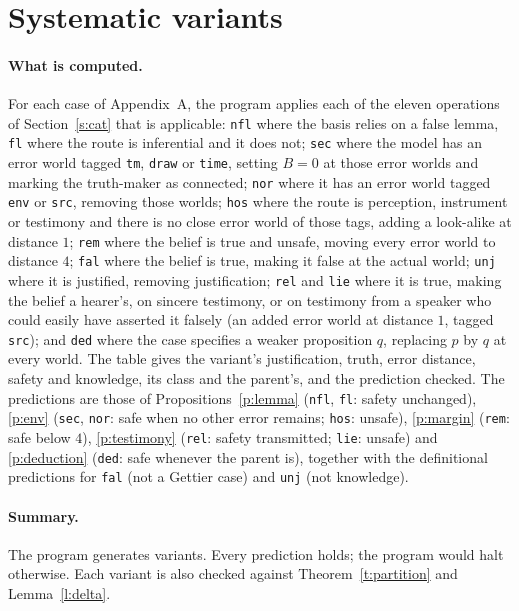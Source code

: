 \documentclass{situationist-preprint}
\begin{document}


\section{Systematic variants}\label{app:b}

\paragraph{What is computed.} For each case of Appendix~A, the program applies each of the eleven operations of Section~\ref{s:cat} that is applicable: \texttt{nfl} where the basis relies on a false lemma, \texttt{fl} where the route is inferential and it does not; \texttt{sec} where the model has an error world tagged \texttt{tm}, \texttt{draw} or \texttt{time}, setting $B = 0$ at those error worlds and marking the truth-maker as connected; \texttt{nor} where it has an error world tagged \texttt{env} or \texttt{src}, removing those worlds; \texttt{hos} where the route is perception, instrument or testimony and there is no close error world of those tags, adding a look-alike at distance $1$; \texttt{rem} where the belief is true and unsafe, moving every error world to distance $4$; \texttt{fal} where the belief is true, making it false at the actual world; \texttt{unj} where it is justified, removing justification; \texttt{rel} and \texttt{lie} where it is true, making the belief a hearer's, on sincere testimony, or on testimony from a speaker who could easily have asserted it falsely (an added error world at distance $1$, tagged \texttt{src}); and \texttt{ded} where the case specifies a weaker proposition $q$, replacing $p$ by $q$ at every world. The table gives the variant's justification, truth, error distance, safety and knowledge, its class and the parent's, and the prediction checked. The predictions are those of Propositions~\ref{p:lemma} (\texttt{nfl}, \texttt{fl}: safety unchanged), \ref{p:env} (\texttt{sec}, \texttt{nor}: safe when no other error remains; \texttt{hos}: unsafe), \ref{p:margin} (\texttt{rem}: safe below $4$), \ref{p:testimony} (\texttt{rel}: safety transmitted; \texttt{lie}: unsafe) and \ref{p:deduction} (\texttt{ded}: safe whenever the parent is), together with the definitional predictions for \texttt{fal} (not a Gettier case) and \texttt{unj} (not knowledge).

\paragraph{Summary.} The program generates \stnvariants{} variants. Every prediction holds; the program would halt otherwise. Each variant is also checked against Theorem~\ref{t:partition} and Lemma~\ref{l:delta}.
\end{document}
